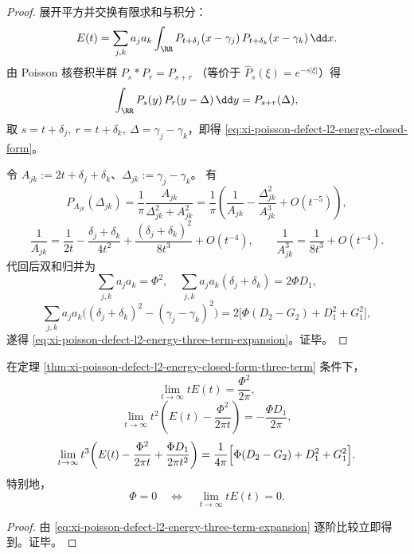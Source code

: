 \begin{proof}
展开平方并交换有限求和与积分：
\[
E(t)=\sum_{j,k}a_ja_k
\int_{\RR}
P_{t+\delta_j}(x-\gamma_j)\,P_{t+\delta_k}(x-\gamma_k)\,\dd x.
\]
由 Poisson 核卷积半群
\(
P_s*P_r=P_{s+r}
\)
（等价于 \(\widehat P_s(\xi)=e^{-s|\xi|}\)）得
\[
\int_{\RR}P_s(y)\,P_r(y-\Delta)\,\dd y=P_{s+r}(\Delta),
\]
取 \(s=t+\delta_j,\ r=t+\delta_k,\ \Delta=\gamma_j-\gamma_k\)，即得
\eqref{eq:xi-poisson-defect-l2-energy-closed-form}。

令 \(A_{jk}:=2t+\delta_j+\delta_k\)、\(\Delta_{jk}:=\gamma_j-\gamma_k\)。
有
\[
P_{A_{jk}}(\Delta_{jk})
=\frac{1}{\pi}\frac{A_{jk}}{\Delta_{jk}^2+A_{jk}^2}
=\frac{1}{\pi}\left(\frac{1}{A_{jk}}-\frac{\Delta_{jk}^2}{A_{jk}^3}+O(t^{-5})\right),
\]
\[
\frac{1}{A_{jk}}
=\frac{1}{2t}-\frac{\delta_j+\delta_k}{4t^2}
+\frac{(\delta_j+\delta_k)^2}{8t^3}+O(t^{-4}),
\qquad
\frac{1}{A_{jk}^3}
=\frac{1}{8t^3}+O(t^{-4}).
\]
代回后双和归并为
\[
\sum_{j,k}a_ja_k=\Phi^2,\quad
\sum_{j,k}a_ja_k(\delta_j+\delta_k)=2\Phi D_1,
\]
\[
\sum_{j,k}a_ja_k\bigl((\delta_j+\delta_k)^2-(\gamma_j-\gamma_k)^2\bigr)
=2\bigl[\Phi(D_2-G_2)+D_1^2+G_1^2\bigr],
\]
遂得 \eqref{eq:xi-poisson-defect-l2-energy-three-term-expansion}。证毕。
\end{proof}

\begin{corollary}[能量尾项反演与宏观不变量重建]\label{cor:xi-poisson-defect-l2-energy-tail-inversion}
在定理 \ref{thm:xi-poisson-defect-l2-energy-closed-form-three-term} 条件下，
\begin{equation}\label{eq:xi-poisson-defect-energy-tail-limit-1}
\lim_{t\to\infty}tE(t)=\frac{\Phi^2}{2\pi},
\end{equation}
\begin{equation}\label{eq:xi-poisson-defect-energy-tail-limit-2}
\lim_{t\to\infty}t^2\!\left(E(t)-\frac{\Phi^2}{2\pi t}\right)
=-\frac{\Phi D_1}{2\pi},
\end{equation}
\begin{equation}\label{eq:xi-poisson-defect-energy-tail-limit-3}
\lim_{t\to\infty}t^3\!\left(E(t)-\frac{\Phi^2}{2\pi t}+\frac{\Phi D_1}{2\pi t^2}\right)
=\frac{1}{4\pi}\Bigl[\Phi(D_2-G_2)+D_1^2+G_1^2\Bigr].
\end{equation}
特别地，
\[
\Phi=0\quad\Longleftrightarrow\quad \lim_{t\to\infty}tE(t)=0.
\]
\end{corollary}

\begin{proof}
由 \eqref{eq:xi-poisson-defect-l2-energy-three-term-expansion} 逐阶比较立即得到。证毕。
\end{proof}

\endinput
